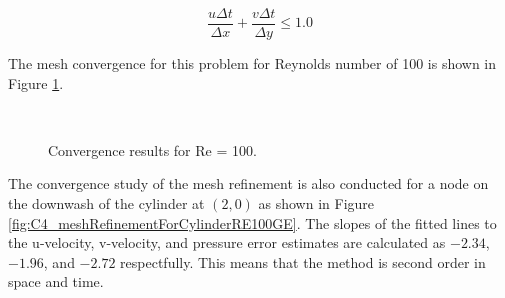 \begin{equation}\label{eq:C4_CFLnumber}
	\frac{u \Delta t}{\Delta x} + \frac{v \Delta t}{\Delta y} \leq 1.0
\end{equation}

The mesh convergence for this problem for Reynolds number of 100 is shown in Figure \ref{fig:C4_meshConvergenceForCylidnerRE100GE}.

\begin{figure}[H]
    \centering
    \quad
    \\
    \caption{Convergence results for Re = 100.}
    \label{fig:C4_meshConvergenceForCylidnerRE100GE}
\end{figure}

The convergence study of the mesh refinement is also conducted for a node on the downwash of the cylinder at $(2, 0)$ as shown in Figure \ref{fig:C4_meshRefinementForCylinderRE100GE}. The slopes of the fitted lines to the u-velocity, v-velocity, and pressure error estimates are calculated as $-2.34$, $-1.96$, and $-2.72$ respectfully. This means that the method is second order in space and time.

